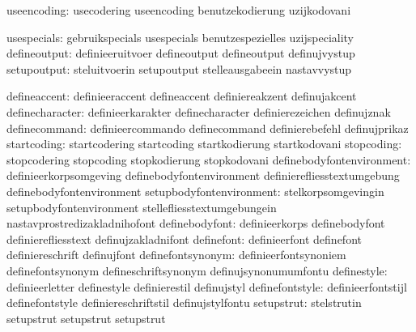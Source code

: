                   useencoding:  usecodering                  useencoding
                                benutzekodierung             uzijkodovani

                  usespecials:  gebruikspecials              usespecials
                                benutzespezielles            uzijspeciality
                 defineoutput:  definieeruitvoer             defineoutput
                                defineoutput                 definujvystup
                  setupoutput:  steluitvoerin                setupoutput
                                stelleausgabeein             nastavvystup

                 defineaccent:  definieeraccent              defineaccent
                                definiereakzent              definujakcent
              definecharacter:  definieerkarakter            definecharacter
                                definierezeichen             definujznak
                definecommand:  definieercommando            definecommand
                                definierebefehl              definujprikaz
                  startcoding:  startcodering                startcoding
                                startkodierung               startkodovani
                   stopcoding:  stopcodering                 stopcoding
                                stopkodierung                stopkodovani
    definebodyfontenvironment:  definieerkorpsomgeving       definebodyfontenvironment
                                definierefliesstextumgebung  definebodyfontenvironment %
     setupbodyfontenvironment:  stelkorpsomgevingin          setupbodyfontenvironment
                                stellefliesstextumgebungein  nastavprostredizakladnihofont
               definebodyfont:  definieerkorps               definebodyfont
                                definierefliesstext          definujzakladnifont
                   definefont:  definieerfont                definefont
                                definiereschrift             definujfont
            definefontsynonym:  definieerfontsynoniem        definefontsynonym
                                defineschriftsynonym         definujsynonumumfontu
                  definestyle:  definieerletter              definestyle
                                definierestil                definujstyl
              definefontstyle:  definieerfontstijl           definefontstyle
                                definiereschriftstil         definujstylfontu
                   setupstrut:  stelstrutin                  setupstrut
                                setupstrut                   setupstrut

